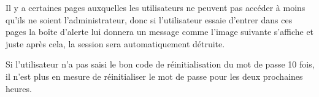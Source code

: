 \documentclass{article}
\begin{document}
\begin{enumerate}
  Il y a certaines pages auxquelles les utilisateurs ne peuvent pas accéder à moins qu'ils ne soient l'administrateur, donc si l'utilisateur essaie d'entrer dans ces pages la boîte d'alerte lui donnera un message comme l'image suivante s'affiche et juste après cela, la session sera automatiquement détruite.
  
   
  
\vspace{0.7cm}
               \hspace*{-0.7in}
               \noindent{} 



Si l'utilisateur n'a pas saisi le bon code de réinitialisation du mot de passe 10 fois, il n'est plus en mesure de réinitialiser le mot de passe pour les deux prochaines heures.



  
\vspace{0.7cm}
               \hspace*{-0.7in}
               \noindent{} 




\end{enumerate}
\end{document}
